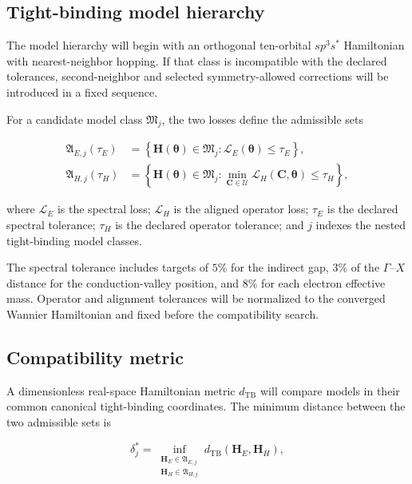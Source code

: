 \documentclass[preprint,12pt]{elsarticle}
\begin{document}
\subsection{Tight-binding model hierarchy}
\label{sec:model-hierarchy}

The model hierarchy will begin with an orthogonal ten-orbital
$sp^3s^{\ast}$ Hamiltonian with nearest-neighbor hopping. If that class is
incompatible with the declared tolerances, second-neighbor and selected
symmetry-allowed corrections will be introduced in a fixed sequence.

For a candidate model class $\mathfrak{M}_{j}$, the two losses define the
admissible sets

\begin{align}
\mathfrak{A}_{E,j}(\tau_E)
&=
\left\{
\bm{H}(\bm{\theta})\in\mathfrak{M}_{j}
:
\mathcal{L}_{E}(\bm{\theta})\leq\tau_E
\right\},
\label{eq:spectral-admissible-set}
\\
\mathfrak{A}_{H,j}(\tau_H)
&=
\left\{
\bm{H}(\bm{\theta})\in\mathfrak{M}_{j}
:
\min_{\bm{C}\in\mathcal{U}}
\mathcal{L}_{H}(\bm{C},\bm{\theta})
\leq\tau_H
\right\},
\label{eq:operator-admissible-set}
\end{align}

where $\mathcal{L}_{E}$ is the spectral loss; $\mathcal{L}_{H}$ is the aligned
operator loss; $\tau_E$ is the declared spectral tolerance; $\tau_H$ is the
declared operator tolerance; and $j$ indexes the nested tight-binding model
classes.

The spectral tolerance includes targets of $5\%$ for the indirect gap, $3\%$
of the $\Gamma$--$X$ distance for the conduction-valley position, and $8\%$
for each electron effective mass. Operator and alignment tolerances will be
normalized to the converged Wannier Hamiltonian and fixed before the
compatibility search.

\subsection{Compatibility metric}
\label{sec:compatibility-metric}

A dimensionless real-space Hamiltonian metric $d_{\mathrm{TB}}$ will compare
models in their common canonical tight-binding coordinates. The minimum
distance between the two admissible sets is

\begin{equation}
\delta_{j}^{\ast}
=
\inf_{
\substack{
\bm{H}_{E}\in\mathfrak{A}_{E,j}\\
\bm{H}_{H}\in\mathfrak{A}_{H,j}
}
}
d_{\mathrm{TB}}(\bm{H}_{E},\bm{H}_{H}),
\label{eq:set-distance}
\end{equation}
\end{document}
